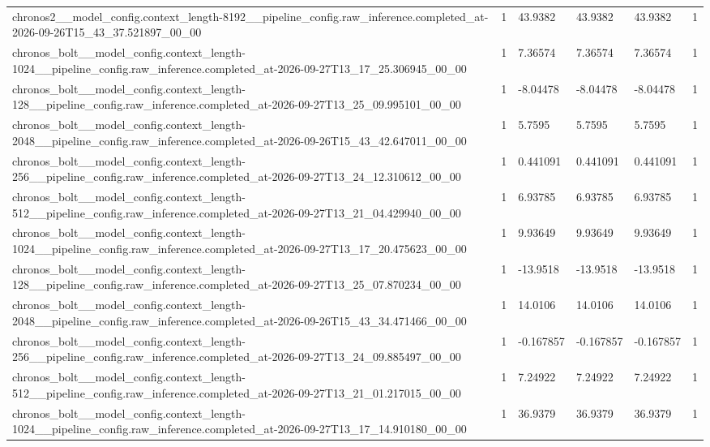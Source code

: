 \begin{tabular}{llllll}
chronos2\_\_model\_config.context\_length-8192\_\_pipeline\_config.raw\_inference.completed\_at-2026-09-26T15\_43\_37.521897\_00\_00 & 1 & 43.9382 & 43.9382 & 43.9382 & 1 \\
chronos\_bolt\_\_model\_config.context\_length-1024\_\_pipeline\_config.raw\_inference.completed\_at-2026-09-27T13\_17\_25.306945\_00\_00 & 1 & 7.36574 & 7.36574 & 7.36574 & 1 \\
chronos\_bolt\_\_model\_config.context\_length-128\_\_pipeline\_config.raw\_inference.completed\_at-2026-09-27T13\_25\_09.995101\_00\_00 & 1 & -8.04478 & -8.04478 & -8.04478 & 1 \\
chronos\_bolt\_\_model\_config.context\_length-2048\_\_pipeline\_config.raw\_inference.completed\_at-2026-09-26T15\_43\_42.647011\_00\_00 & 1 & 5.7595 & 5.7595 & 5.7595 & 1 \\
chronos\_bolt\_\_model\_config.context\_length-256\_\_pipeline\_config.raw\_inference.completed\_at-2026-09-27T13\_24\_12.310612\_00\_00 & 1 & 0.441091 & 0.441091 & 0.441091 & 1 \\
chronos\_bolt\_\_model\_config.context\_length-512\_\_pipeline\_config.raw\_inference.completed\_at-2026-09-27T13\_21\_04.429940\_00\_00 & 1 & 6.93785 & 6.93785 & 6.93785 & 1 \\
chronos\_bolt\_\_model\_config.context\_length-1024\_\_pipeline\_config.raw\_inference.completed\_at-2026-09-27T13\_17\_20.475623\_00\_00 & 1 & 9.93649 & 9.93649 & 9.93649 & 1 \\
chronos\_bolt\_\_model\_config.context\_length-128\_\_pipeline\_config.raw\_inference.completed\_at-2026-09-27T13\_25\_07.870234\_00\_00 & 1 & -13.9518 & -13.9518 & -13.9518 & 1 \\
chronos\_bolt\_\_model\_config.context\_length-2048\_\_pipeline\_config.raw\_inference.completed\_at-2026-09-26T15\_43\_34.471466\_00\_00 & 1 & 14.0106 & 14.0106 & 14.0106 & 1 \\
chronos\_bolt\_\_model\_config.context\_length-256\_\_pipeline\_config.raw\_inference.completed\_at-2026-09-27T13\_24\_09.885497\_00\_00 & 1 & -0.167857 & -0.167857 & -0.167857 & 1 \\
chronos\_bolt\_\_model\_config.context\_length-512\_\_pipeline\_config.raw\_inference.completed\_at-2026-09-27T13\_21\_01.217015\_00\_00 & 1 & 7.24922 & 7.24922 & 7.24922 & 1 \\
chronos\_bolt\_\_model\_config.context\_length-1024\_\_pipeline\_config.raw\_inference.completed\_at-2026-09-27T13\_17\_14.910180\_00\_00 & 1 & 36.9379 & 36.9379 & 36.9379 & 1 \\

\end{tabular}
